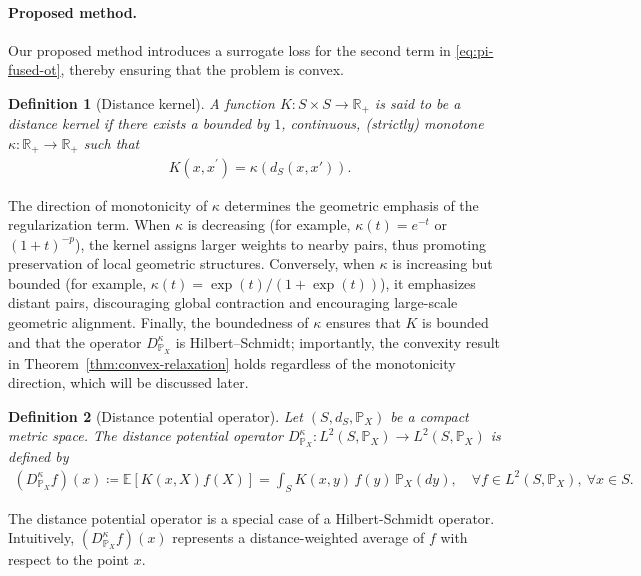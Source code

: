\documentclass{article}
\newtheorem{definition}{Definition}
\begin{document}
\paragraph{Proposed method.} Our proposed method introduces a surrogate loss for the second term in \eqref{eq:pi-fused-ot}, thereby ensuring that the problem is convex.
\begin{definition}[Distance kernel]
	\label{def:kernel}
	A function $K: S \times S \to \mathbb{R}_+$ is said to be a \emph{distance kernel} if there exists a bounded by $1$, continuous, (strictly) monotone $\kappa: \mathbb{R}_+ \to \mathbb{R}_+$ such that
	\begin{align*}
		K(x,x^\prime) = \kappa\left(d_S(x,x')\right) .
	\end{align*}
\end{definition}
The direction of monotonicity of $\kappa$ determines the geometric emphasis of the regularization term. 
When $\kappa$ is decreasing (for example, $\kappa(t) = e^{-t}$ or $(1+t)^{-p}$), the kernel assigns larger weights to nearby pairs, thus promoting preservation of local geometric structures. 
Conversely, when $\kappa$ is increasing but bounded (for example, $\kappa(t)=\exp(t)/(1+\exp(t))$), it emphasizes distant pairs, discouraging global contraction and encouraging large-scale geometric alignment. 
Finally, the boundedness of $\kappa$ ensures that $K$ is bounded and that the operator $D_{\mathbb{P}_X}^{\kappa}$ is Hilbert--Schmidt; importantly, the convexity result in Theorem~\ref{thm:convex-relaxation} holds regardless of the monotonicity direction, which will be discussed later.

\begin{definition}[Distance potential operator]
	\label{def:distance-potential}
	Let $(S,d_S,\mathbb{P}_X)$ be a compact metric space. The \emph{distance potential operator} $D_{\mathbb{P}_X}^{\kappa} : L^2(S,\mathbb{P}_X) \to L^2(S,\mathbb{P}_X)$ is defined by
	\begin{align*}
		(D_{\mathbb{P}_X}^{\kappa}f)(x) \coloneqq \mathbb{E}\left[K(x,X)f(X)\right] = \int_S K(x,y)\, f(y)\, \mathbb{P}_X(dy) , \quad \forall f \in L^2(S,\mathbb{P}_X),\ \forall x \in S .
	\end{align*}
\end{definition}
The distance potential operator is a special case of a Hilbert-Schmidt operator. Intuitively, $(D_{\mathbb{P}_X}^{\kappa} f)(x)$ represents a distance-weighted average of $f$ with respect to the point $x$.
\end{document}
